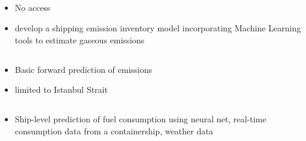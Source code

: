 \documentclass{article}
\newcommand{\paperpath}{../resources/}
\newcommand{\myhref}[2]{\href{run:\paperpath#1}{#2}}
\begin{document}
\subsection{\href{https://www.intmaritimeengineering.org/index.php/ijme/article/view/1073}{\textcite{fletcher2018application}}}
\begin{itemize}
    \item No access
    \item develop a shipping emission inventory model incorporating Machine Learning tools to estimate gaseous emissions
\end{itemize}
\subsection{\myhref{Ay et al 2022 - Quantifying ship-borne emissions in Istanbul Strait with bottom-up and.pdf}{\textcite{ay2022quantifying}}}
\begin{itemize}
    \item Basic forward prediction of emissions
    \item limited to Istanbul Strait
\end{itemize}
\subsection{\myhref{Hu et al 2019 - Prediction of Fuel Consumption for Enroute Ship Based on Machine Learning.pdf}{\textcite{hu2019prediction}}}
\begin{itemize}
    \item Ship-level prediction of fuel consumption using neural net, real-time consumption data from a containership, weather data
\end{itemize}
\end{document}
